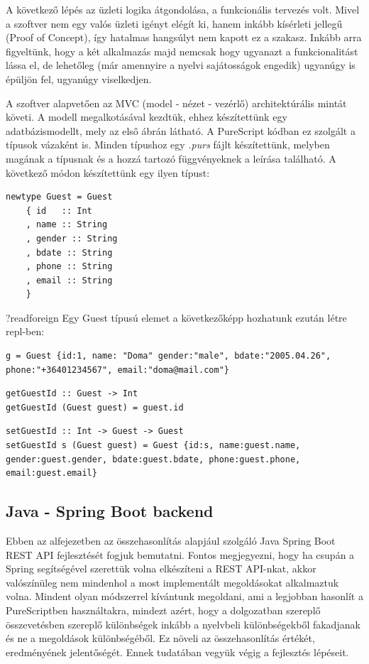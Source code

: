 \documentclass[12pt]{article}
\begin{document}
A következő lépés az üzleti logika átgondolása, a funkcionális tervezés volt. Mivel a szoftver nem egy valós üzleti igényt elégít ki, hanem inkább kísérleti jellegű (Proof of Concept), így hatalmas hangsúlyt nem kapott ez a szakasz. Inkább arra figyeltünk, hogy a két alkalmazás majd nemcsak hogy ugyanazt a funkcionalitást lássa el, de lehetőleg (már amennyire a nyelvi sajátosságok engedik) ugyanúgy is épüljön fel, ugyanúgy viselkedjen. 

A szoftver alapvetően az MVC (model - nézet - vezérlő) architektúrális mintát követi.  A modell megalkotásával kezdtük, ehhez készítettünk egy adatbázismodellt, mely az első ábrán látható. A PureScript kódban ez szolgált a típusok vázaként is. Minden típushoz egy \textit{.purs} fájlt készítettünk, melyben magának a típusnak és a hozzá tartozó függvényeknek a leírása található. A következő módon készítettünk egy ilyen típust:

\begin{verbatim}
newtype Guest = Guest
    { id   :: Int
    , name :: String
    , gender :: String
    , bdate :: String
    , phone :: String
    , email :: String
    }
\end{verbatim}
?readforeign
Egy Guest típusú elemet a következőképp hozhatunk ezután létre repl-ben:
\begin{verbatim}
g = Guest {id:1, name: "Doma" gender:"male", bdate:"2005.04.26", phone:"+36401234567", email:"doma@mail.com"}
\end{verbatim}

\begin{verbatim}
getGuestId :: Guest -> Int
getGuestId (Guest guest) = guest.id
\end{verbatim}

\begin{verbatim}
setGuestId :: Int -> Guest -> Guest
setGuestId s (Guest guest) = Guest {id:s, name:guest.name, gender:guest.gender, bdate:guest.bdate, phone:guest.phone, email:guest.email}

\end{verbatim}

\subsection{Java - Spring Boot backend}

Ebben az alfejezetben az összehasonlítás alapjául szolgáló Java Spring Boot REST API fejlesztését fogjuk bemutatni. Fontos megjegyezni, hogy ha csupán a Spring segítségével szerettük volna elkészíteni a REST API-nkat, akkor valószínüleg nem mindenhol a most implementált megoldásokat alkalmaztuk volna. Mindent olyan módszerrel kívántunk megoldani, ami a legjobban hasonlít a PureScriptben használtakra, mindezt azért, hogy a dolgozatban szereplő összevetésben szereplő különbségek inkább a nyelvbeli különbségekből fakadjanak és ne a megoldások különbségéből. Ez növeli az összehasonlítás értékét, eredményének jelentőségét. Ennek tudatában vegyük végig a fejlesztés lépéseit.
\end{document}
